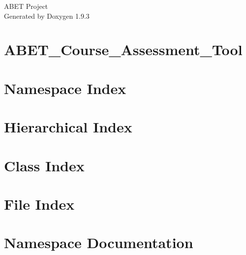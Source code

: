 \documentclass[twoside]{book}
\newcommand{\+}{\discretionary{\mbox{\scriptsize$\hookleftarrow$}}{}{}}
\newcommand{\clearemptydoublepage}{%
    \newpage{\pagestyle{empty}\cleardoublepage}%
  }
\begin{document}
  \raggedbottom
    \hypersetup{pageanchor=false,
                bookmarksnumbered=true,
                pdfencoding=unicode
               }
  \begin{titlepage}
  \vspace*{7cm}
  \begin{center}%
  {\Large ABET Project}\\
  \vspace*{1cm}
  {\large Generated by Doxygen 1.9.3}\\
  \end{center}
  \end{titlepage}
  \clearemptydoublepage
  \tableofcontents
  \clearemptydoublepage
  \hypersetup{pageanchor=true}
\chapter{ABET\+\_\+\+Course\+\_\+\+Assessment\+\_\+\+Tool}
\label{md__c___users__chet_l__documents__git_hub_desktop_segfault_wizards__abet_api__r_e_a_d_m_e}

\chapter{Namespace Index}

\chapter{Hierarchical Index}

\chapter{Class Index}

\chapter{File Index}

\chapter{Namespace Documentation}







\end{document}
